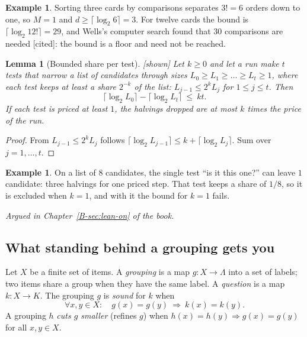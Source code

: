 \documentclass[11pt, a4paper]{article}
\theoremstyle{plain}
\newtheorem{lemma}[theorem]{Lemma}
\theoremstyle{definition}
\newtheorem{example}[theorem]{Example}
\theoremstyle{remark}
\newcommand{\argued}[1]{\par\noindent\textit{Argued in Chapter~\ref{B-#1} of the book.}\par}
\newcommand{\kind}[1]{\textup{[#1]}}
\begin{document}
\begin{example}\label{spec:sorting-floor}
Sorting three cards by comparisons separates $3!=6$ orders down to one, so $M=1$ and $d\ge\lceil\log_2 6\rceil=3$.
For twelve cards the bound is $\lceil\log_2 12!\rceil=29$, and Wells's computer search found that $30$
comparisons are needed \kind{cited}: the bound is a floor and need not be reached.
\end{example}

\begin{lemma}[Bounded share per test]\label{spec:share} \kind{shown}
Let $k\ge0$ and let a run make $t$ tests that narrow a list of candidates through sizes
$L_0\ge L_1\ge\dots\ge L_t\ge1$, where each test keeps at least a share $2^{-k}$ of the list:
$L_{j-1}\le 2^kL_j$ for $1\le j\le t$. Then
\[
\lceil\log_2 L_0\rceil-\lceil\log_2 L_t\rceil\ \le\ kt .
\]
If each test is priced at least $1$, the halvings dropped are at most $k$ times the price of the run.
\end{lemma}

\begin{proof}
From $L_{j-1}\le 2^kL_j$ follows $\lceil\log_2L_{j-1}\rceil\le k+\lceil\log_2L_j\rceil$. Sum over
$j=1,\dots,t$.
\end{proof}

\begin{example}\label{spec:share-needed}
On a list of $8$ candidates, the single test ``is it this one?'' can leave $1$ candidate: three halvings
for one priced step. That test keeps a share of $1/8$, so it is excluded when $k=1$, and with it the bound
for $k=1$ fails.
\end{example}

\argued{sec:lean-on}

\subsection*{What standing behind a grouping gets you}

Let $X$ be a finite set of items. A \emph{grouping} is a map $g:X\to\Lambda$ into a set of labels; two
items share a group when they have the same label. A \emph{question} is a map $k:X\to K$. The grouping
$g$ is \emph{sound} for $k$ when
\[
\forall x,y\in X:\quad g(x)=g(y)\ \Longrightarrow\ k(x)=k(y).
\]
A grouping $h$ \emph{cuts $g$ smaller} (refines $g$) when $h(x)=h(y)\Rightarrow g(x)=g(y)$ for all
$x,y\in X$.
\end{document}
